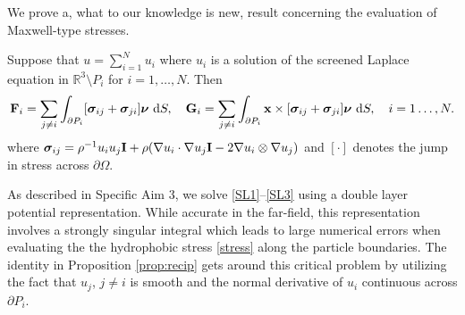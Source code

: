 We prove a, what to our knowledge is new, result concerning the evaluation of Maxwell-type stresses. 
\begin{proposition}
  \label{prop:recip}
  Suppose that $u = \sum_{i=1}^N u_i$ where $u_i$ is a solution of the screened Laplace equation
  in $\mathbb{R}^3 \setminus P_i$ for $i=1,\dots, N.$ Then 
\begin{equation}
{\bf F}_i = \sum_{j \neq i} \int_{\partial P_i}[\boldsymbol{\sigma}_{ij} + \boldsymbol{\sigma}_{ji}]\boldsymbol{\nu}\,\dif S,\quad
{\bf G}_i = \sum_{j \neq i} \int_{\partial P_i} {\bf x} \times [\boldsymbol{\sigma}_{ij} + \boldsymbol{\sigma}_{ji}]\boldsymbol{\nu}\,\dif S, \quad i = 1\dots, N.
\end{equation}
where $\boldsymbol{\sigma}_{ij} = \rho^{-1} u_iu_j {\bf I} + \rho(\nabla u_i \cdot \nabla u_j {\bf I} - 2 \nabla u_i \otimes \nabla u_j)$ and
$[\cdot]$ denotes the jump in stress across $\partial \Omega.$ 
\end{proposition}
As described in Specific Aim 3, we solve \eqref{SL1}--\eqref{SL3}  using a double layer potential representation.
While accurate in the far-field, this representation involves a strongly singular integral which
leads to large numerical errors when evaluating the the hydrophobic stress \eqref{stress} along the particle boundaries.
The identity in Proposition \ref{prop:recip} gets around this critical problem by utilizing the fact that $u_j$, $j\neq i$ is smooth and the normal derivative
of  $u_i$ continuous across $\partial P_i$.



